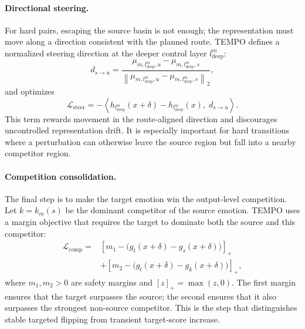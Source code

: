 \paragraph{Directional steering.}
For hard pairs, escaping the source basin is not enough; the representation must move along a direction consistent with the planned route. TEMPO defines a normalized steering direction at the deeper control layer $l^{m}_{\mathrm{deep}}$:
\begin{equation}
d_{s\rightarrow u}
=
\frac{\mu_{m,l^{m}_{\mathrm{deep}},u}-\mu_{m,l^{m}_{\mathrm{deep}},s}}
{\left\|\mu_{m,l^{m}_{\mathrm{deep}},u}-\mu_{m,l^{m}_{\mathrm{deep}},s}\right\|_2},
\label{eq:tempo-direction}
\end{equation}
and optimizes
\begin{equation}
\mathcal{L}_{\mathrm{steer}}
=
-\left\langle
h_{l^{m}_{\mathrm{deep}}}(x+\delta)-h_{l^{m}_{\mathrm{deep}}}(x),\;
 d_{s\rightarrow u}
\right\rangle.
\label{eq:tempo-steer}
\end{equation}
This term rewards movement in the route-aligned direction and discourages uncontrolled representation drift. It is especially important for hard transitions where a perturbation can otherwise leave the source region but fall into a nearby competitor region.

\paragraph{Competition consolidation.}
The final step is to make the target emotion win the output-level competition. Let $k=k_m(s)$ be the dominant competitor of the source emotion. TEMPO uses a margin objective that requires the target to dominate both the source and this competitor:
\begin{equation}
\begin{aligned}
\mathcal{L}_{\mathrm{comp}}
={}&
\left[m_1 - \big(g_t(x+\delta)-g_s(x+\delta)\big)\right]_+
\\
&+
\left[m_2 - \big(g_t(x+\delta)-g_k(x+\delta)\big)\right]_+,
\end{aligned}
\label{eq:tempo-comp}
\end{equation}
where $m_1,m_2>0$ are safety margins and $[z]_+=\max(z,0)$. The first margin ensures that the target surpasses the source; the second ensures that it also surpasses the strongest non-source competitor. This is the step that distinguishes stable targeted flipping from transient target-score increase.

